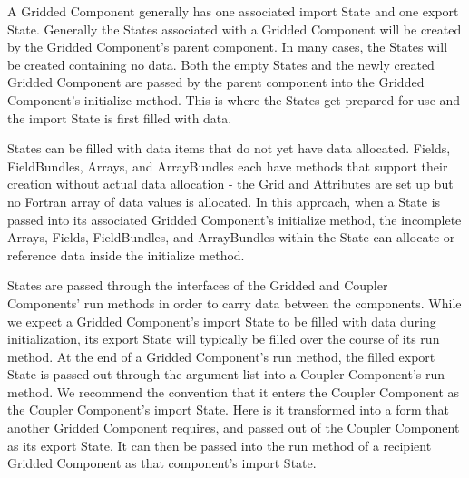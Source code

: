 %


A Gridded Component generally has one associated import 
State and one export State.  Generally the States 
associated with a Gridded Component will be created by 
the Gridded Component's parent component.
In many cases, the States will be created containing 
no data.  Both the empty States and the
newly created Gridded Component are passed
by the parent component into the Gridded Component's initialize 
method.  This is where the States get prepared for use 
and the import State is first filled with data.

States can be filled with data items that do not yet 
have data allocated.  Fields, FieldBundles, Arrays, and ArrayBundles each have 
methods that support their creation without actual data 
allocation - the Grid and Attributes are set up but no
Fortran array of data values is allocated.  In this approach, 
when a State is passed into its associated Gridded Component's 
initialize method, the incomplete Arrays, Fields, FieldBundles,
and ArrayBundles within the State can allocate or reference data 
inside the initialize method.

States are passed through the interfaces of the Gridded 
and Coupler Components' run methods in order to carry data 
between the components.  While we expect
a Gridded Component's import State to be filled with data 
during initialization, its export State will typically be
filled over the course of its run method.  At the end of
a Gridded Component's run method, the filled export State 
is passed out through the argument list into a Coupler 
Component's run method.  We recommend the convention that 
it enters the Coupler Component as the Coupler Component's
import State.  Here is it transformed into a form
that another Gridded Component requires, and passed out
of the Coupler Component as its export State.  It can then
be passed into the run method of a recipient Gridded Component
as that component's import State.

